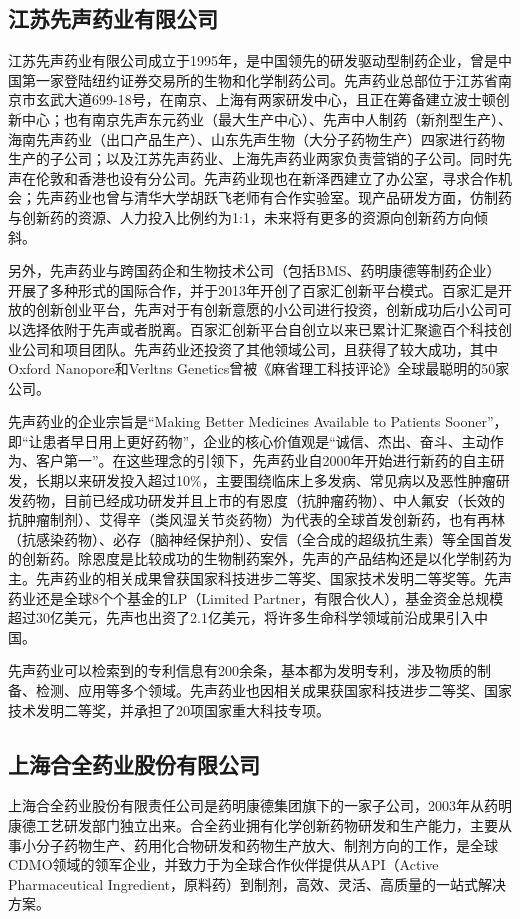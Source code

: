 \documentclass{apa6}
\begin{document}
		\subsection{江苏先声药业有限公司}
		
		江苏先声药业有限公司成立于1995年，是中国领先的研发驱动型制药企业，曾是中国第一家登陆纽约证券交易所的生物和化学制药公司。先声药业总部位于江苏省南京市玄武大道699-18号，在南京、上海有两家研发中心，且正在筹备建立波士顿创新中心；也有南京先声东元药业（最大生产中心）、先声中人制药（新剂型生产）、海南先声药业（出口产品生产）、山东先声生物（大分子药物生产）四家进行药物生产的子公司；以及江苏先声药业、上海先声药业两家负责营销的子公司。同时先声在伦敦和香港也设有分公司。先声药业现也在新泽西建立了办公室，寻求合作机会；先声药业也曾与清华大学胡跃飞老师有合作实验室。现产品研发方面，仿制药与创新药的资源、人力投入比例约为1:1，未来将有更多的资源向创新药方向倾斜\citep{RN34}。
		
		另外，先声药业与跨国药企和生物技术公司（包括BMS、药明康德等制药企业）开展了多种形式的国际合作，并于2013年开创了百家汇创新平台模式。百家汇是开放的创新创业平台，先声对于有创新意愿的小公司进行投资，创新成功后小公司可以选择依附于先声或者脱离。百家汇创新平台自创立以来已累计汇聚逾百个科技创业公司和项目团队。先声药业还投资了其他领域公司，且获得了较大成功，其中Oxford Nanopore和Verltns Genetics曾被《麻省理工科技评论》全球最聪明的50家公司。
		
		先声药业的企业宗旨是“Making Better Medicines Available to Patients Sooner”，即“让患者早日用上更好药物”，企业的核心价值观是“诚信、杰出、奋斗、主动作为、客户第一”。在这些理念的引领下，先声药业自2000年开始进行新药的自主研发，长期以来研发投入超过10\%，主要围绕临床上多发病、常见病以及恶性肿瘤研发药物，目前已经成功研发并且上市的有恩度（抗肿瘤药物）、中人氟安（长效的抗肿瘤制剂）、艾得辛（类风湿关节炎药物）为代表的全球首发创新药，也有再林（抗感染药物）、必存（脑神经保护剂）、安信（全合成的超级抗生素）等全国首发的创新药。除恩度是比较成功的生物制药案外，先声的产品结构还是以化学制药为主\citep{RN35}。先声药业的相关成果曾获国家科技进步二等奖、国家技术发明二等奖等。先声药业还是全球8个个基金的LP（Limited Partner，有限合伙人），基金资金总规模超过30亿美元，先声也出资了2.1亿美元，将许多生命科学领域前沿成果引入中国。
		
		
		先声药业可以检索到的专利信息有200余条，基本都为发明专利，涉及物质的制备、检测、应用等多个领域。先声药业也因相关成果获国家科技进步二等奖、国家技术发明二等奖，并承担了20项国家重大科技专项。
	
		\subsection{上海合全药业股份有限公司}
	上海合全药业股份有限责任公司是药明康德集团旗下的一家子公司，2003年从药明康德工艺研发部门独立出来。合全药业拥有化学创新药物研发和生产能力，主要从事小分子药物生产、药用化合物研发和药物生产放大、制剂方向的工作，是全球CDMO领域的领军企业，并致力于为全球合作伙伴提供从API（Active Pharmaceutical Ingredient，原料药）到制剂，高效、灵活、高质量的一站式解决方案。
	
\end{document}
